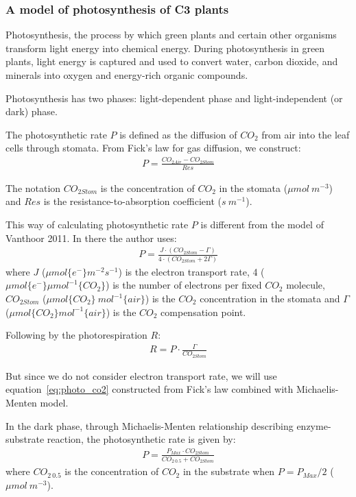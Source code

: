 \documentclass[a4paper]{article}
\numberwithin{equation}{section}
\begin{document}
\subsubsection{A model of photosynthesis of C3 plants}\label{sssec:photo_c3}
Photosynthesis, the process by which green plants and certain other organisms transform light energy into chemical energy. During photosynthesis in green plants, light energy is captured and used to convert water, carbon dioxide, and minerals into oxygen and energy-rich organic compounds.

Photosynthesis has two phases: light-dependent phase and light-independent (or dark) phase.

The photosynthetic rate \(P\) is defined as the diffusion of \(CO_2\) from air into the leaf cells through stomata. From Fick's law for gas diffusion, we construct:
\begin{align}
  \label{eq:photo_co2}
  P = \frac{CO_{2Air} - CO_{2Stom}}{Res}
\end{align}

The notation \(CO_{2Stom}\) is the concentration of \(CO_2\) in the stomata (\(\mu mol\ m^{-3}\)) and \(Res\) is the resistance-to-absorption coefficient (\(s\ m^{-1}\)).

This way of calculating photosynthetic rate \(P\) is different from the model of Vanthoor 2011. In there the author uses:
\begin{align}
  P = \frac{J \cdot (CO_{2Stom} - \Gamma)}{4 \cdot (CO_{2Stom} + 2\Gamma)}
\end{align}
where \(J\) (\(\mu mol \{e^-\} m^{-2} s^{-1}\)) is the electron transport rate, 4 (\(\mu mol \{e^-\} \mu mol^{-1} \{CO_2\}\)) is the
number of electrons per fixed \(CO_2\) molecule, \(CO_{2Stom}\) (\(\mu mol\{CO_2\}\ mol^{-1}\{air\}\)) is the \(CO_2\) concentration in the stomata and \(\Gamma\) (\(\mu mol \{CO_2\} mol^{-1} \{air\}\)) is the \(CO_2\) compensation point.

Following by the photorespiration \(R\):
\begin{align}
  R = P \cdot \frac{\Gamma}{CO_{2Stom}}
\end{align}

But since we do not consider electron transport rate, we will use equation~\eqref{eq:photo_co2} constructed from Fick's law combined with Michaelis-Menten model.

In the dark phase, through Michaelis-Menten relationship describing enzyme-substrate reaction, the photosynthetic rate is given by:
\begin{align}
  \label{eq:photo_dark}
  P = \frac{P_{Max} \cdot CO_{2Stom}}{CO_{2\ 0.5} + CO_{2Stom}}
\end{align}
where \(CO_{2\ 0.5}\) is the concentration of \(CO_2\) in the substrate when \(P = P_{Max}/2\) (\(\mu mol\ m^{-3}\)).
\end{document}
